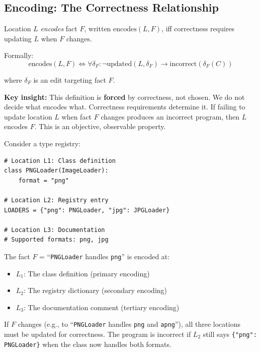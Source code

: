 \subsection{Encoding: The Correctness Relationship}\label{sec:encoding}

\begin{definition}[Encodes]\label{def:encodes}
Location $L$ \emph{encodes} fact $F$, written $\text{encodes}(L, F)$, iff correctness requires updating $L$ when $F$ changes.

Formally:
\[
\text{encodes}(L, F) \Longleftrightarrow \forall \delta_F: \neg\text{updated}(L, \delta_F) \rightarrow \text{incorrect}(\delta_F(C))
\]

where $\delta_F$ is an edit targeting fact $F$.
\end{definition}

\textbf{Key insight:} This definition is \textbf{forced} by correctness, not chosen. We do not decide what encodes what. Correctness requirements determine it. If failing to update location $L$ when fact $F$ changes produces an incorrect program, then $L$ encodes $F$. This is an objective, observable property.

\begin{example}\label{ex:encoding}
Consider a type registry:

\begin{verbatim}
# Location L1: Class definition
class PNGLoader(ImageLoader):
    format = "png"

# Location L2: Registry entry
LOADERS = {"png": PNGLoader, "jpg": JPGLoader}

# Location L3: Documentation
# Supported formats: png, jpg
\end{verbatim}

The fact $F$ = ``\texttt{PNGLoader} handles \texttt{png}'' is encoded at:
\begin{itemize}
\tightlist
\item $L_1$: The class definition (primary encoding)
\item $L_2$: The registry dictionary (secondary encoding)
\item $L_3$: The documentation comment (tertiary encoding)
\end{itemize}

If $F$ changes (e.g., to ``\texttt{PNGLoader} handles \texttt{png} and \texttt{apng}''), all three locations must be updated for correctness. The program is incorrect if $L_2$ still says \texttt{\{"png": PNGLoader\}} when the class now handles both formats.
\end{example}

